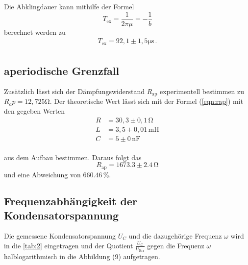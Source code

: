 \noindent
Die Abklingdauer kann mithilfe der Formel 
\begin{equation*}
    T_\text{ex} = \frac{1}{2\pi\mu} = - \frac{1}{b}
\end{equation*}
berechnet werden zu
\begin{align*}
    T_\text{ex} = 92,1 \pm 1,5 \si{\micro\second} \, . \\
\end{align*}



\subsection{aperiodische Grenzfall}
Zusätzlich lässt sich der Dämpfungswiderstand $R_\text{ap}$ experimentell bestimmen zu $R_ap = 12,725 \si{\ohm}$. Der theoretische Wert lässt sich mit der Formel (\ref{eqn:rap}) %
mit den gegeben Werten
\begin{align*}
   R &= 30,3 \pm 0,1 \, \si{\ohm} \\
   L &= 3,5 \pm 0,01 \, \si{\milli\henry} \\
   C &= 5 \pm 0 \, \si{\nano\farad} \\
\end{align*}

\noindent
aus dem Aufbau bestimmen. Daraus folgt das $$ R_\text{ap} = 1673.3 \pm 2.4 \, \si{\ohm} $$ und eine Abweichung von $ 660.46 \, \si{\percent}$.

\subsection{Frequenzabhängigkeit der Kondensatorspannung}

Die gemessene Kondensatorspannung $U_C$ und die dazugehörige Frequenz $\omega$ wird in die \autoref{tab:2} eingetragen und 
der Quotient $\frac{U_C}{U_\text{Err}}$ gegen die Frequenz $\omega$ halblogarithmisch in die Abbildung (9) aufgetragen.

